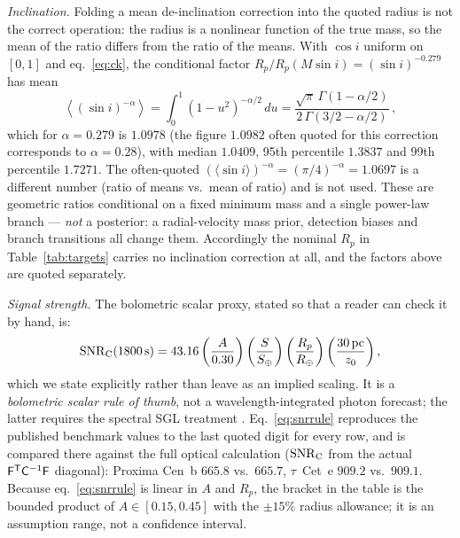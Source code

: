 \documentclass[twocolumn,10pt]{article}
\begin{document}
\emph{Inclination.} Folding a mean de-inclination correction into the
quoted radius is not the correct operation: the radius is a nonlinear
function of the true mass, so the mean of the ratio differs from the ratio of the
means. With $\cos i$ uniform on $[0,1]$ and eq.~\ref{eq:ck}, the conditional
factor $R_p/R_p(M\sin i)=(\sin i)^{-0.279}$ has mean
\begin{equation}
\left\langle(\sin i)^{-\alpha}\right\rangle
=\int_0^1(1-u^2)^{-\alpha/2}\,du
=\frac{\sqrt{\pi}\,\Gamma(1-\alpha/2)}{2\,\Gamma(3/2-\alpha/2)}\,,
\label{eq:deincl}
\end{equation}
which for $\alpha=0.279$ is $1.0978$ (the figure $1.0982$ often quoted for this
correction corresponds to
$\alpha=0.28$), with median $1.0409$, 95th percentile $1.3837$ and 99th
percentile $1.7271$.
The often-quoted $\left(\langle\sin i\rangle\right)^{-\alpha}
=(\pi/4)^{-\alpha}=1.0697$ is a different number (ratio of means vs.\ mean of
ratio) and is not used. These are geometric ratios conditional on a fixed
minimum mass and a single power-law branch --- \emph{not} a posterior: a
radial-velocity mass prior, detection biases and branch transitions all change
them. Accordingly the nominal $R_p$ in Table~\ref{tab:targets} carries no
inclination correction at all, and the factors above are quoted separately.

\emph{Signal strength.} The bolometric scalar proxy, stated so that a reader
can check it by hand, is:
\begin{equation}
\mathrm{SNR}_{\rm C}(1800\,\mathrm{s})
=43.16\left(\frac{A}{0.30}\right)
\left(\frac{S}{S_\oplus}\right)
\left(\frac{R_p}{R_\oplus}\right)
\left(\frac{30\,\mathrm{pc}}{z_0}\right),
\label{eq:snrrule}
\end{equation}
which we state explicitly rather than leave as an implied scaling. It is a
\emph{bolometric scalar rule of thumb}, not a wavelength-integrated photon
forecast; the latter requires the spectral SGL treatment
\citep{tt22spec,tt23ext}. Eq.~\ref{eq:snrrule} reproduces the published benchmark
values to the last quoted digit for every row, and is compared there against the
full optical calculation ($\mathrm{SNR}_{\rm C}$ from the actual
$\mathsf{F}^{\sf T}\mathsf{C}^{-1}\mathsf{F}$ diagonal): Proxima Cen~b
$665.8$ vs.\ $665.7$, $\tau$~Cet~e $909.2$ vs.\ $909.1$. Because
eq.~\ref{eq:snrrule} is linear in $A$ and $R_p$, the bracket in the table is the
bounded product of $A\in[0.15,0.45]$ with the $\pm15\%$ radius allowance; it is
an assumption range, not a confidence interval.
\end{document}
